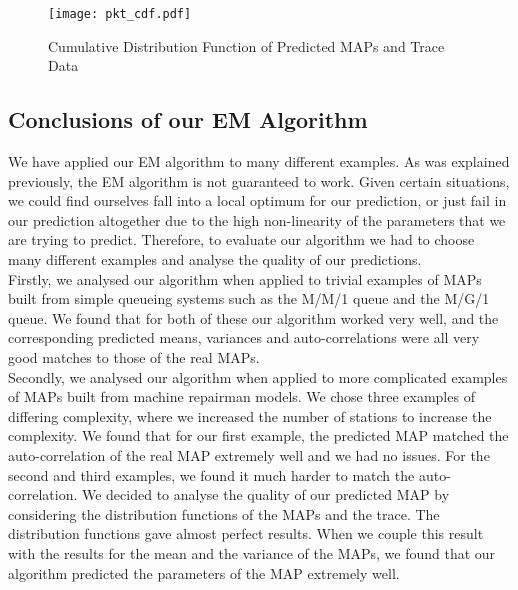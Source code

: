 \documentclass[a4paper,11pt,titlepage]{article}
\begin{document}
\begin{figure}[h!]
\begin{center}
\texttt{[image: pkt\_cdf.pdf]}
\caption{Cumulative Distribution Function of Predicted MAPs and Trace Data}
\label{fig:pkt_cdf}
\end{center}
\end{figure}


\subsection{Conclusions of our EM Algorithm}

We have applied our EM algorithm to many different examples. As was explained previously, the EM algorithm is not guaranteed to work. Given certain situations, we could find ourselves fall into a local optimum for our prediction, or just fail in our prediction altogether due to the high non-linearity of the parameters that we are trying to predict. Therefore, to evaluate our algorithm we had to choose many different examples and analyse the quality of our predictions. \\

Firstly, we analysed our algorithm when applied to trivial examples of MAPs built from simple queueing systems such as the M/M/1 queue and the M/G/1 queue. We found that for both of these our algorithm worked very well, and the corresponding predicted means, variances and auto-correlations were all very good matches to those of the real MAPs. \\

Secondly, we analysed our algorithm when applied to more complicated examples of MAPs built from machine repairman models. We chose three examples of differing complexity, where we increased the number of stations to increase the complexity. We found that for our first example, the predicted MAP matched the auto-correlation of the real MAP extremely well and we had no issues. For the second and third examples, we found it much harder to match the auto-correlation. We decided to analyse the quality of our predicted MAP by considering the distribution functions of the MAPs and the trace. The distribution functions gave almost perfect results. When we couple this result with the results for the mean and the variance of the MAPs, we found that our algorithm predicted the parameters of the MAP extremely well. \\
\end{document}

